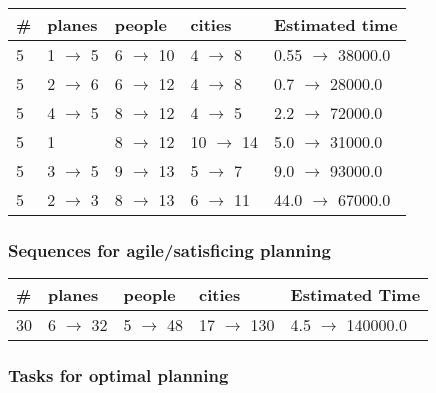 \documentclass{article}
\begin{document}
                            \begin{center}
                            \begin{tabular}{@{}l|l|l|l|l@{}}
                            \# & planes & people & cities & Estimated time\\\midrule
                            5&1 $\rightarrow$ 5&6 $\rightarrow$ 10&4 $\rightarrow$ 8&0.55 $\rightarrow$ 38000.0\\
5&2 $\rightarrow$ 6&6 $\rightarrow$ 12&4 $\rightarrow$ 8&0.7 $\rightarrow$ 28000.0\\
5&4 $\rightarrow$ 5&8 $\rightarrow$ 12&4 $\rightarrow$ 5&2.2 $\rightarrow$ 72000.0\\
5&1&8 $\rightarrow$ 12&10 $\rightarrow$ 14&5.0 $\rightarrow$ 31000.0\\
5&3 $\rightarrow$ 5&9 $\rightarrow$ 13&5 $\rightarrow$ 7&9.0 $\rightarrow$ 93000.0\\
5&2 $\rightarrow$ 3&8 $\rightarrow$ 13&6 $\rightarrow$ 11&44.0 $\rightarrow$ 67000.0
                            \end{tabular}
                            \end{center}
                    
                         \subsubsection*{Sequences for agile/satisficing planning}

                        \begin{center}
                        \begin{tabular}{@{}l|l|l|l|l@{}}
                        \# & planes & people & cities & Estimated Time\\\midrule
                        30&6 $\rightarrow$ 32&5 $\rightarrow$ 48&17 $\rightarrow$ 130&4.5 $\rightarrow$ 140000.0
                        \end{tabular}
                        \end{center}
                    
                                \subsubsection*{Tasks for optimal planning}
                                
\end{document}
